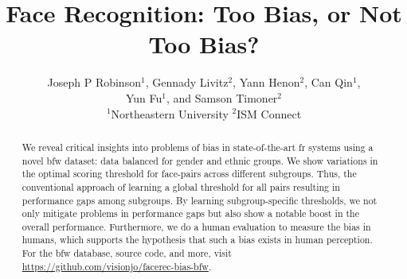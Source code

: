 \documentclass[10pt,twocolumn,letterpaper]{article}
\begin{document}
\title{Face Recognition: Too Bias, or Not Too Bias?}

\author{\parbox{16cm}{\centering
    {\large Joseph P Robinson$^1$, Gennady Livitz$^2$, Yann Henon$^2$, Can Qin$^1$,\\ Yun Fu$^1$, and Samson Timoner$^2$}\\
    {\normalsize
    \hspace{-.4in}$^{1}$Northeastern University\hspace{.7in} $^{2}$ISM Connect}}
}


\maketitle

\begin{abstract}
We reveal critical insights into problems of bias in state-of-the-art \gls{fr} systems using a novel \gls{bfw} dataset: data balanced for gender and ethnic groups. We show variations in the optimal scoring threshold for face-pairs across different subgroups. Thus, the conventional approach of learning a  global threshold for all pairs resulting in performance gaps among subgroups. By learning subgroup-specific thresholds, we not only mitigate problems in performance gaps but also show a notable boost in the overall performance. Furthermore, we do a human evaluation to measure the bias in humans, which supports the hypothesis that such a bias exists in human perception. For the \gls{bfw} database, source code, and more, visit \href{https://github.com/visionjo/facerec-bias-bfw}{https://github.com/visionjo/facerec-bias-bfw}.
\end{abstract}




\end{document}
